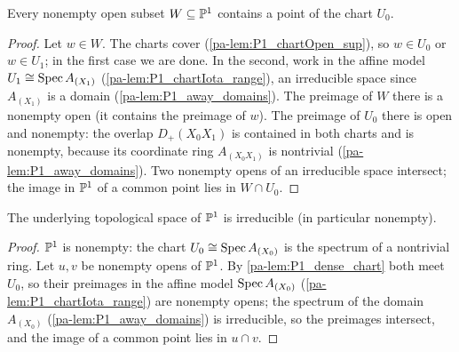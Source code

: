 \begin{lemma}
  \label{pa-lem:P1_dense_chart}
  \leanok

  Every nonempty open subset \(W \subseteq \mathbb{P}^1\) contains a point of the chart \(U_0\).
\end{lemma}
\begin{proof}
  \leanok
  Let \(w \in W\). The charts cover (\ref{pa-lem:P1_chartOpen_sup}), so \(w \in U_0\) or
  \(w \in U_1\); in the first case we are done. In the second, work in the affine model
  \(U_1 \cong \operatorname{Spec} A_{(X_1)}\) (\ref{pa-lem:P1_chartIota_range}), an irreducible space since
  \(A_{(X_1)}\) is a domain (\ref{pa-lem:P1_away_domains}). The preimage of \(W\) there is a
  nonempty open (it contains the preimage of \(w\)). The preimage of \(U_0\) there is open
  and nonempty: the overlap \(D_+(X_0X_1)\) is contained in both charts and is nonempty,
  because its coordinate ring \(A_{(X_0X_1)}\) is nontrivial (\ref{pa-lem:P1_away_domains}).
  Two nonempty opens of an irreducible space intersect; the image in \(\mathbb{P}^1\) of a common
  point lies in \(W \cap U_0\).
\end{proof}

\begin{theorem}
  \label{pa-thm:P1_irreducible}
  \leanok

  The underlying topological space of \(\mathbb{P}^1\) is irreducible (in particular nonempty).
\end{theorem}
\begin{proof}
  \leanok
  \(\mathbb{P}^1\) is nonempty: the chart \(U_0 \cong \operatorname{Spec} A_{(X_0)}\) is the spectrum of a
  nontrivial ring. Let \(u, v\) be nonempty opens of \(\mathbb{P}^1\). By
  \ref{pa-lem:P1_dense_chart} both meet \(U_0\), so their preimages in the affine model
  \(\operatorname{Spec} A_{(X_0)}\) (\ref{pa-lem:P1_chartIota_range}) are nonempty opens; the spectrum of
  the domain \(A_{(X_0)}\) (\ref{pa-lem:P1_away_domains}) is irreducible, so the preimages
  intersect, and the image of a common point lies in \(u \cap v\).
\end{proof}


